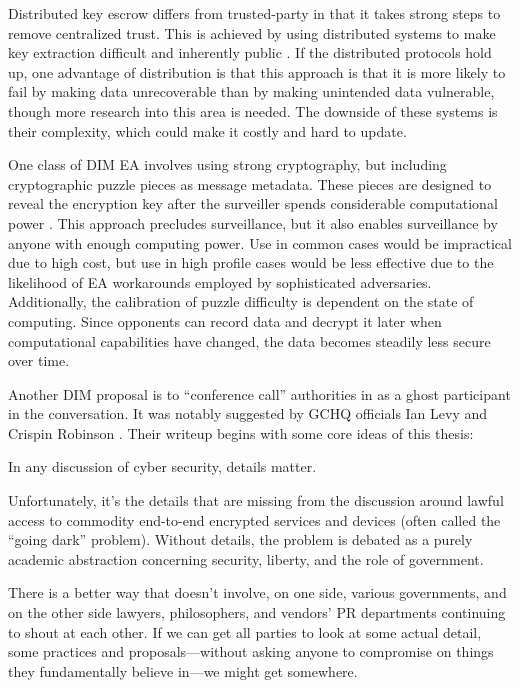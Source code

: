 Distributed key escrow differs from trusted-party in that it takes strong steps to remove centralized trust. This is
achieved by using distributed systems to make key extraction difficult and inherently public \cite{phan_key_2017}
\cite{servan_schreiber_jje_2020}. If the distributed protocols hold up, one advantage of distribution is that this
approach is that it is more likely to fail by making data unrecoverable than by making unintended data vulnerable,
though more research into this area is needed. The downside of these systems is their complexity, which could make it
costly and hard to update.

One class of \ac{DIM} \ac{EA} involves using strong cryptography, but including cryptographic puzzle pieces as message
metadata. These pieces are designed to reveal the encryption key after the surveiller spends considerable computational
power \cite{bellare_translucent_1996} \cite{wright_crypto_2018}. This approach precludes  surveillance, but it
also enables  surveillance by anyone with enough computing power. Use in common cases would be impractical
due to high cost, but use in high profile cases would be less effective due to the likelihood of \ac{EA} workarounds
employed by sophisticated adversaries. Additionally, the calibration of puzzle difficulty is dependent on the state of
computing. Since opponents can record data and decrypt it later when computational capabilities have changed, the data
becomes steadily less secure over time.

Another \ac{DIM} proposal is to ``conference call'' authorities in as a ghost participant in the conversation. It was
notably suggested by \ac{GCHQ} officials Ian Levy and Crispin Robinson \cite{levy_robinson_2018}. Their writeup begins
with some core ideas of this thesis:

\begin{displayquote}
  In any discussion of cyber security, details matter.

  Unfortunately, it's the details that are missing from the discussion around lawful access to commodity end-to-end
  encrypted services and devices (often called the ``going dark'' problem). Without details, the problem is debated as a
  purely academic abstraction concerning security, liberty, and the role of government.

  There is a better way that doesn’t involve, on one side, various governments, and on the other side lawyers,
  philosophers, and vendors' PR departments continuing to shout at each other. If we can get all parties to look at some
  actual detail, some practices and proposals---without asking anyone to compromise on things they fundamentally believe
  in---we might get somewhere.
  \cite{levy_robinson_2018}
\end{displayquote}

